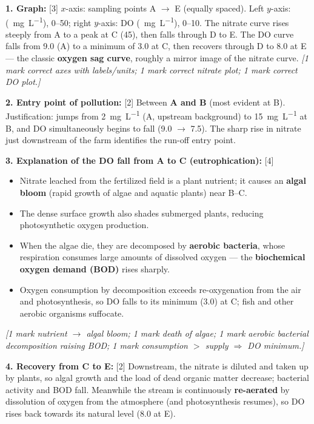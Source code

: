 \documentclass[11pt]{article}
\begin{document}
\begin{corrige}
\textbf{1. Graph:} \hfill [3]
$x$-axis: sampling points A $\rightarrow$ E (equally spaced). Left $y$-axis: \ce{[NO3-]} (\SI{}{\mg\per\L}), 0--50; right $y$-axis: DO (\SI{}{\mg\per\L}), 0--10. The nitrate curve rises steeply from A to a peak at C (45), then falls through D to E. The DO curve falls from 9.0 (A) to a minimum of 3.0 at C, then recovers through D to 8.0 at E --- the classic \textbf{oxygen sag curve}, roughly a mirror image of the nitrate curve.
\emph{[1 mark correct axes with labels/units; 1 mark correct nitrate plot; 1 mark correct DO plot.]}

\textbf{2. Entry point of pollution:} \hfill [2]
Between \textbf{A and B} (most evident at B). Justification: \ce{[NO3-]} jumps from \SI{2}{\mg\per\L} (A, upstream background) to \SI{15}{\mg\per\L} at B, and DO simultaneously begins to fall (9.0 $\rightarrow$ 7.5). The sharp rise in nitrate just downstream of the farm identifies the run-off entry point.

\textbf{3. Explanation of the DO fall from A to C (eutrophication):} \hfill [4]
\begin{itemize}
\item Nitrate leached from the fertilized field is a plant nutrient; it causes an \textbf{algal bloom} (rapid growth of algae and aquatic plants) near B--C.
\item The dense surface growth also shades submerged plants, reducing photosynthetic oxygen production.
\item When the algae die, they are decomposed by \textbf{aerobic bacteria}, whose respiration consumes large amounts of dissolved oxygen --- the \textbf{biochemical oxygen demand (BOD)} rises sharply.
\item Oxygen consumption by decomposition exceeds re-oxygenation from the air and photosynthesis, so DO falls to its minimum (3.0) at C; fish and other aerobic organisms suffocate.
\end{itemize}
\emph{[1 mark nutrient $\rightarrow$ algal bloom; 1 mark death of algae; 1 mark aerobic bacterial decomposition raising BOD; 1 mark consumption $>$ supply $\Rightarrow$ DO minimum.]}

\textbf{4. Recovery from C to E:} \hfill [2]
Downstream, the nitrate is diluted and taken up by plants, so algal growth and the load of dead organic matter decrease; bacterial activity and BOD fall. Meanwhile the stream is continuously \textbf{re-aerated} by dissolution of oxygen from the atmosphere (and photosynthesis resumes), so DO rises back towards its natural level (8.0 at E).


\end{corrige}
\end{document}
